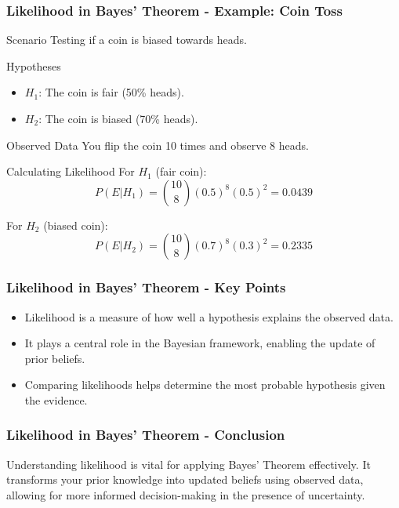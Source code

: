 \documentclass[aspectratio=169]{beamer}
\begin{document}
\begin{frame}[fragile]
    \frametitle{Likelihood in Bayes' Theorem - Example: Coin Toss}
    \begin{block}{Scenario}
        Testing if a coin is biased towards heads.
    \end{block}

    \begin{block}{Hypotheses}
        \begin{itemize}
            \item \( H_1 \): The coin is fair (50\% heads).
            \item \( H_2 \): The coin is biased (70\% heads).
        \end{itemize}
    \end{block}

    \begin{block}{Observed Data}
        You flip the coin 10 times and observe 8 heads.
    \end{block}

    \begin{block}{Calculating Likelihood}
        For \( H_1 \) (fair coin):
        \[
        P(E | H_1) = \binom{10}{8} (0.5)^8 (0.5)^2 = 0.0439
        \]
        
        For \( H_2 \) (biased coin):
        \[
        P(E | H_2) = \binom{10}{8} (0.7)^8 (0.3)^2 = 0.2335
        \]
    \end{block}
\end{frame}

\begin{frame}[fragile]
    \frametitle{Likelihood in Bayes' Theorem - Key Points}
    \begin{itemize}
        \item Likelihood is a measure of how well a hypothesis explains the observed data.
        \item It plays a central role in the Bayesian framework, enabling the update of prior beliefs.
        \item Comparing likelihoods helps determine the most probable hypothesis given the evidence.
    \end{itemize}
\end{frame}

\begin{frame}[fragile]
    \frametitle{Likelihood in Bayes' Theorem - Conclusion}
    Understanding likelihood is vital for applying Bayes' Theorem effectively. It transforms your prior knowledge into updated beliefs using observed data, allowing for more informed decision-making in the presence of uncertainty.
\end{frame}
\end{document}
